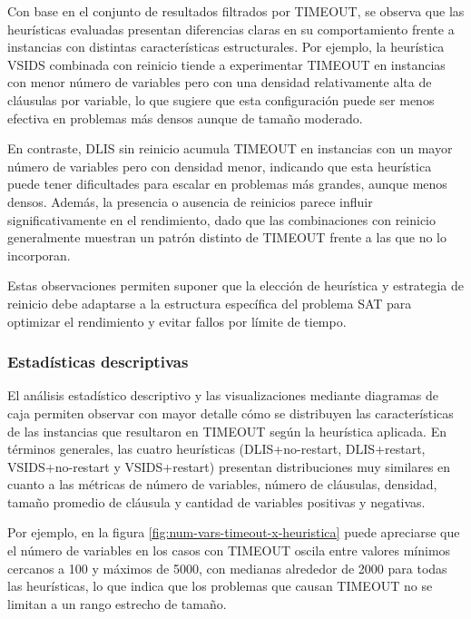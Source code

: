 Con base en el conjunto de resultados filtrados por TIMEOUT, se observa que las heurísticas evaluadas presentan diferencias claras en su comportamiento frente a instancias con distintas características estructurales. Por ejemplo, la heurística VSIDS combinada con reinicio tiende a experimentar TIMEOUT en instancias con menor número de variables pero con una densidad relativamente alta de cláusulas por variable, lo que sugiere que esta configuración puede ser menos efectiva en problemas más densos aunque de tamaño moderado. 

En contraste, DLIS sin reinicio acumula TIMEOUT en instancias con un mayor número de variables pero con densidad menor, indicando que esta heurística puede tener dificultades para escalar en problemas más grandes, aunque menos densos. Además, la presencia o ausencia de reinicios parece influir significativamente en el rendimiento, dado que las combinaciones con reinicio generalmente muestran un patrón distinto de TIMEOUT frente a las que no lo incorporan. 

Estas observaciones permiten suponer que la elección de heurística y estrategia de reinicio debe adaptarse a la estructura específica del problema SAT para optimizar el rendimiento y evitar fallos por límite de tiempo.

\subsubsection{Estad\'isticas descriptivas}

El análisis estadístico descriptivo y las visualizaciones mediante diagramas de caja permiten observar con mayor detalle cómo se distribuyen las características de las instancias que resultaron en TIMEOUT según la heurística aplicada. En términos generales, las cuatro heurísticas (DLIS+no-restart, DLIS+restart, VSIDS+no-restart y VSIDS+restart) presentan distribuciones muy similares en cuanto a las métricas de número de variables, número de cláusulas, densidad, tamaño promedio de cláusula y cantidad de variables positivas y negativas.

Por ejemplo, en la figura \ref{fig:num-vars-timeout-x-heuristica} puede apreciarse que el número de variables en los casos con TIMEOUT oscila entre valores mínimos cercanos a 100 y máximos de 5000, con medianas alrededor de 2000 para todas las heurísticas, lo que indica que los problemas que causan TIMEOUT no se limitan a un rango estrecho de tamaño.

